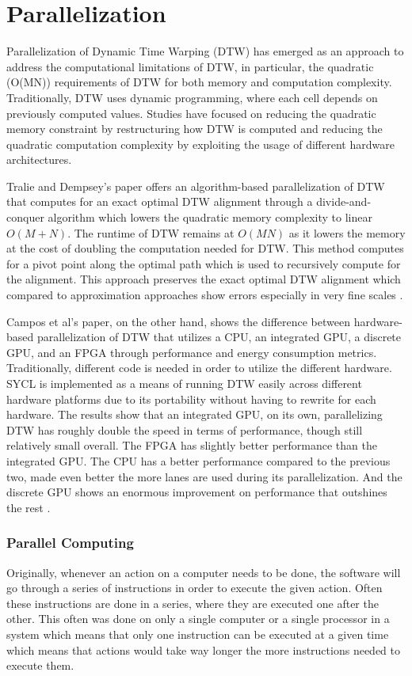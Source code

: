 \section{Parallelization}
Parallelization of Dynamic Time Warping (DTW) has emerged as an approach to address the computational limitations of DTW, in particular, the quadratic (O(MN)) requirements of DTW for both memory and computation complexity. Traditionally, DTW uses dynamic programming, where each cell depends on previously computed values. Studies have focused on reducing the quadratic memory constraint by restructuring how DTW is computed and reducing the quadratic computation complexity by exploiting the usage of different hardware architectures.

Tralie and Dempsey’s paper offers an algorithm-based parallelization of DTW that computes for an exact optimal DTW alignment through a divide-and-conquer algorithm which lowers the quadratic memory complexity to linear $O(M + N)$. The runtime of DTW remains at $O(MN)$ as it lowers the memory at the cost of doubling the computation needed for DTW. This method computes for a pivot point along the optimal path which is used to recursively compute for the alignment. This approach preserves the exact optimal DTW alignment which compared to approximation approaches show errors especially in very fine scales \cite{TralieDempsey}.

Campos et al’s paper, on the other hand, shows the difference between hardware-based parallelization of DTW that utilizes a CPU, an integrated GPU, a discrete GPU, and an FPGA through performance and energy consumption metrics. Traditionally, different code is needed in order to utilize the different hardware. SYCL is implemented as a means of running DTW easily across different hardware platforms due to its portability without having to rewrite for each hardware. The results show that an integrated GPU, on its own, parallelizing DTW has roughly double the speed in terms of performance, though still relatively small overall. The FPGA has slightly better performance than the integrated GPU. The CPU has a better performance compared to the previous two, made even better the more lanes are used during its parallelization. And the discrete GPU shows an enormous improvement on performance that outshines the rest \cite{GPUParallelization}.

\subsubsection{Parallel Computing}
Originally, whenever an action on a computer needs to be done, the software will go through a series of instructions in order to execute the given action. Often these instructions are done in a series, where they are executed one after the other. This often was done on only a single computer or a single processor in a system which means that only one instruction can be executed at a given time which means that actions would take way longer the more instructions needed to execute them.

